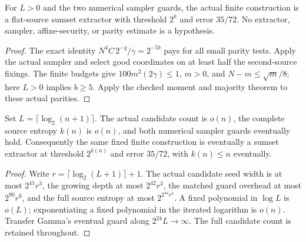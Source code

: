 \begin{theorem}
  \label{thm:lowerbounds-algebraic-finite-sumset-construction}
  \leanok
  For $L>0$ and the two numerical sampler guards, the actual finite
  construction is a flat-source sumset extractor with threshold $2^k$
  and error $35/72$. No extractor, sampler, affine-security, or parity
  estimate is a hypothesis.
\end{theorem}
\begin{proof}
  \leanok
  The exact identity $N^4 C\,2^{-q}/\gamma=2^{-5b}$ pays for all
  small parity tests. Apply the actual sampler and select good
  coordinates on at least half the second-source fixings. The finite
  budgets give $100m^2(2\gamma)\le1$, $m>0$, and
  $N-m\le\sqrt m/8$; here $L>0$ implies $b\ge5$.
  Apply the checked moment and majority theorem to these actual parities.
\end{proof}

\begin{theorem}
  \label{thm:lowerbounds-algebraic-sumset-construction-asymptotics}
  \leanok
  Set $L=\lceil\log_2(n+1)\rceil$. The actual candidate count is $o(n)$,
  the complete source entropy $k(n)$ is $o(n)$, and both numerical
  sampler guards eventually hold. Consequently the same fixed finite
  construction is eventually a sumset extractor at threshold $2^{k(n)}$
  and error $35/72$, with $k(n)\le n$ eventually.
\end{theorem}
\begin{proof}
  \leanok
  Write $r=\lceil\log_2(L+1)\rceil+1$. The actual candidate seed width
  is at most $2^{41}r^3$, the growing depth at most $2^{42}r^3$, the
  matched guard overhead at most $2^{90}r^6$, and the full source entropy
  at most $2^{2^{44}r^3}$. A fixed polynomial in $\log L$ is $o(L)$;
  exponentiating a fixed polynomial in the iterated logarithm is $o(n)$.
  Transfer Gamma's eventual guard along $2^{24}L\to\infty$.
  The full candidate count is retained throughout.
\end{proof}

